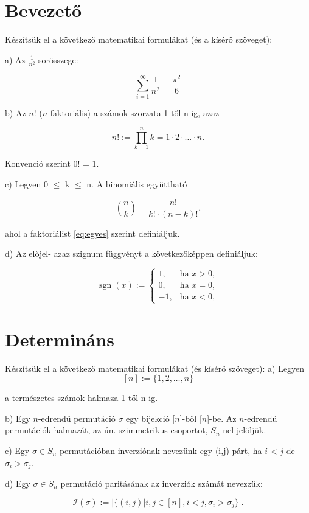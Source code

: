 \documentclass{article}
\begin{document}
\section{Bevezető}

Készítsük el a következő matematikai formulákat (és a kísérő szöveget):

a) Az $\frac{1}{n^2}$ sorösszege:

\[\sum_{i=1}^\infty\frac{1}{n^2}=\frac{\pi^2}{6}\]

b) Az $n!$ ($n$ faktoriális) a számok szorzata 1-től n-ig, azaz

\begin{equation}
n! := \prod_{k=1}^n k = 1 \cdot 2 \cdot \ldots \cdot n\text{.}
\label{eq:egyes}
\end{equation}

Konvenció szerint 0! = 1.

c) Legyen 0 $\leq$ k $\leq$ n. A binomiális együttható

\[\binom{n}{k} = \frac{n!}{k!\cdot(n-k)!}\text{,}\]

ahol a faktoriálist \eqref{eq:egyes} szerint definiáljuk.

d) Az előjel- azaz szignum függvényt a következőképpen definiáljuk:

\[\operatorname{sgn}(x) := \begin{cases}
1, & \text{ha } x > 0,\\
0, & \text{ha } x = 0,\\
-1, & \text{ha } x < 0,
\end{cases}\]


\section{Determináns}

Készítsük el a következő matematikai formulákat (és kísérő szöveget):
a) Legyen 
\[[n] := \lbrace1, 2, \ldots, n\rbrace\]

a természetes számok halmaza 1-től n-ig.

b) Egy $n$-edrendű $\text{permutáció }\sigma$ egy bijekció [$n$]-ből [$n$]-be. Az $n$-edrendű permutációk halmazát, az ún. szimmetrikus csoportot, $S_n$-nel jelöljük.

c) Egy $\sigma \in S_n$ permutációban inverziónak nevezünk egy (i,j) párt, ha $i$ < $j$ de $\sigma_i > \sigma_j$.

d) Egy $\sigma \in S_n$ permutáció paritásának az inverziók számát nevezzük:

\[ \mathcal{I}(\sigma) := \vert \lbrace(i, j) \vert i, j \in [n],i<j,\sigma_i>\sigma_j\rbrace\vert.\]
\end{document}
